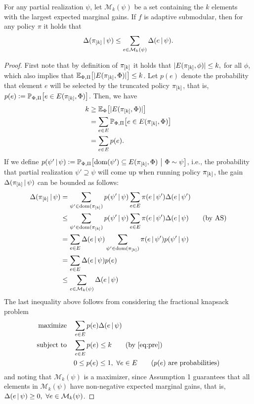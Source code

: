 \begin{lemma}
  For any partial realization $\psi$, let $\mathcal{M}_k(\psi)$ be a set containing the $k$ elements with the largest expected marginal gains.
  If $f$ is adaptive submodular, then for any policy $\pi$ it holds that
  \begin{align*}
    \Delta(\pi_{[k]}\,\vert\,\psi) \leq \sum_{e \in \mathcal{M}_k(\psi)} \Delta(e\,\vert\,\psi).
  \end{align*}
\end{lemma}
\begin{proof}
  First note that by definition of $\pi_{[k]}$ it holds that $|E(\pi_{[k]}, \phi)| \leq k,$ for all $\phi$, which also implies that $\E[\Phi,\Pi]{|E(\pik, \Phi)|} \leq k$.
  Let $p(e)$ denote the probability that element $e$ will be selected by the truncated policy $\pi_{[k]}$, that is, $p(e) \defeq \P[\Phi,\Pi]{e \in E(\pik, \Phi)}$.
  Then, we have
  \begin{align}
    \label{eq:pre}
    \begin{split}
      k &\geq \E[\Phi]{|E(\pik, \Phi)|}\\
        &= \sum_{e \in E}\P[\Phi,\Pi]{e \in E(\pik, \Phi)}\\
        &= \sum_{e \in E}p(e).
    \end{split}
  \end{align}
  If we define $p(\psi'\mmid\psi) \defeq \P[\Phi,\Pi]{\dom(\psi') \subseteq E(\pik, \Phi)}[\Phi \sim \psi]$, i.e., the probability that partial realization $\psi' \supseteq \psi$ will come up when running policy $\pi_{[k]}$, the gain $\Delta(\pi_{[k]}\,\vert\,\psi)$ can be bounded as follows:
  \begin{align*}
    \Delta(\pi_{[k]}\,\vert\,\psi) &= \sum_{\psi' \in \operatorname{dom}(\pi_{[k]})}p(\psi'\,\vert\,\psi)\sum_{e \in E}\pi(e\,\vert\,\psi')\Delta(e\,\vert\,\psi')\\
    &\leq \sum_{\psi' \in \operatorname{dom}(\pi_{[k]})}p(\psi'\,\vert\,\psi)\sum_{e \in E}\pi(e\,\vert\,\psi')\Delta(e\,\vert\,\psi) \tag*{(by AS)}\\
    &= \sum_{e \in E}\Delta(e\,\vert\,\psi) \sum_{\psi' \in \operatorname{dom}(\pi_{[k]})}\pi(e\,\vert\,\psi')p(\psi'\,\vert\,\psi)\\
    &= \sum_{e \in E}\Delta(e\,\vert\,\psi) p(e)\\
    &\leq \sum_{e \in \mathcal{M}_k(\psi)} \Delta(e\,\vert\,\psi)
  \end{align*}
  The last inequality above follows from considering the fractional knapsack problem
  \begin{align*}
    \textrm{maximize} & \quad \sum_{e \in E}p(e)\D{e}{\psi}\\
    \textrm{subject to} & \quad \sum_{e \in E}p(e) \leq k \tag*{(by \eqref{eq:pre})}\\
               & \quad 0 \leq p(e) \leq 1,\ \forall e \in E \tag*{($p(e)$ are probabilities)}
  \end{align*}
  and noting that $\mathcal{M}_k(\psi)$ is a maximizer, since Assumption 1 guarantees that all elements in  $\mathcal{M}_k(\psi)$ have non-negative expected marginal gains, that is, $\Delta(e\,\vert\,\psi) \geq 0,\ \forall e \in \mathcal{M}_k(\psi)$.
\end{proof}

